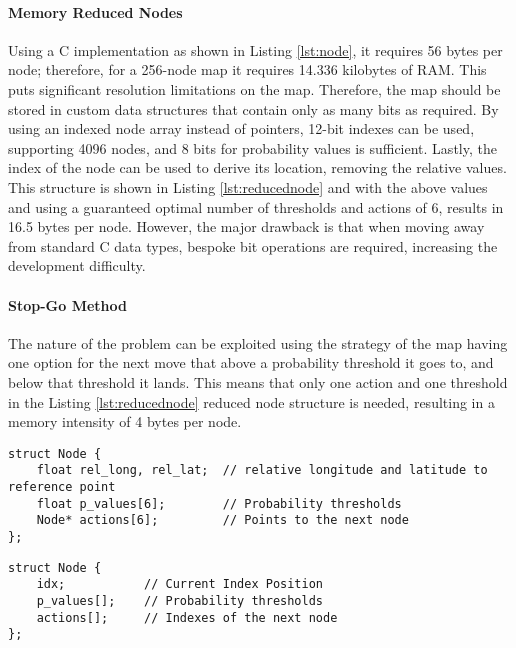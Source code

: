 \paragraph{Memory Reduced Nodes}
Using a C implementation as shown in Listing \ref{lst:node}, it requires 56 bytes per node; therefore, for a 256-node map it requires 14.336 kilobytes of \gls{RAM}. This puts significant resolution limitations on the map. Therefore, the map should be stored in custom data structures that contain only as many bits as required. By using an indexed node array instead of pointers, 12-bit indexes can be used, supporting 4096 nodes, and 8 bits for probability values is sufficient. Lastly, the index of the node can be used to derive its location, removing the relative values. This structure is shown in Listing \ref{lst:reducednode} and with the above values and using a guaranteed optimal number of thresholds and actions of 6, results in 16.5 bytes per node. However, the major drawback is that when moving away from standard C data types, bespoke bit operations are required, increasing the development difficulty. 
\paragraph{Stop-Go Method}
The nature of the problem can be exploited using the strategy of the map having one option for the next move that above a probability threshold it goes to, and below that threshold it lands. This means that only one action and one threshold in the Listing \ref{lst:reducednode} reduced node structure is needed, resulting in a memory intensity of 4 bytes per node.
\newpage
\begin{lstlisting}[caption={Implementated Node Structure},label={lst:node}]
struct Node {
    float rel_long, rel_lat;  // relative longitude and latitude to reference point
    float p_values[6];        // Probability thresholds
    Node* actions[6];         // Points to the next node
};
\end{lstlisting}
\begin{lstlisting}[caption={Node Structure},label={lst:reducednode}]
struct Node {
    idx;           // Current Index Position
    p_values[];    // Probability thresholds
    actions[];     // Indexes of the next node
};
\end{lstlisting}

